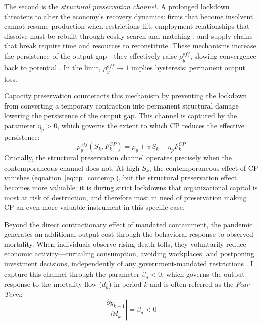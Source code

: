 \documentclass[12pt, a4paper]{article}
\begin{document}
The second is the \textit{structural preservation channel}. A prolonged lockdown threatens to alter the economy's recovery dynamics: firms that become insolvent cannot resume production when restrictions lift, employment relationships that dissolve must be rebuilt through costly search and matching \citep{Fujita2024}, and supply chains that break require time and resources to reconstitute. These mechanisms increase the persistence of the output gap---they effectively raise $\rho^{eff}_y$, slowing convergence back to potential \citep{Kozlowski2020, Cerra2020}. In the limit, $\rho^{eff}_y \to 1$ implies hysteresis: permanent output loss.

Capacity preservation counteracts this mechanism by preventing the lockdown from converting a temporary contraction into permanent structural damage lowering the persistence of the output gap. This channel is captured by the parameter $\eta_p > 0$, which governs the extent to which CP reduces the effective persistence:
%
\begin{equation}
    \rho^{eff}_y(S_k, F^{CP}_k) = \rho_y + \psi S_k - \eta_p F^{CP}_k
    \label{eq:rho_eff}
\end{equation}
%
Crucially, the structural preservation channel operates precisely when the contemporaneous channel does not. At high $S_k$, the contemporaneous effect of CP vanishes (equation~\ref{eq:cp_contemp}), but the structural preservation effect becomes more valuable: it is during strict lockdowns that organizational capital is most at risk of destruction, and therefore most in need of preservation making CP an even more valuable instrument in this specific case.

Beyond the direct contractionary effect of mandated containment, the pandemic generates an additional output cost through the behavioral response to observed mortality. When individuals observe rising death tolls, they voluntarily reduce economic activity---curtailing consumption, avoiding workplaces, and postponing investment decisions, independently of any government-mandated restrictions \citep{GOOLSBEE2021}. I capture this channel through the parameter $\beta_d < 0$, which governs the output response to the mortality flow ($d_k$) in period $k$ and is often referred as the \textit{Fear Term}:
%
\begin{equation}
    \left.\frac{\partial y_{k+1}}{\partial d_k}\right| = \beta_d < 0
    \label{eq:fear}
\end{equation}
%
\end{document}
